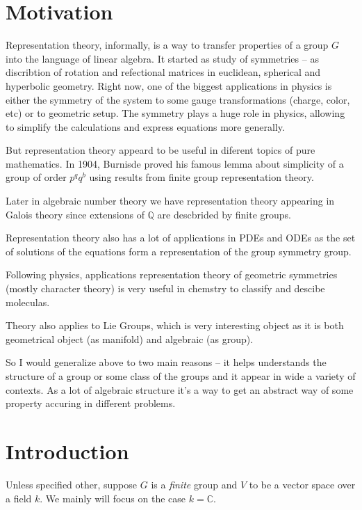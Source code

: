 \documentclass{amsart}
\author{M. Tikhonov}
\begin{document}
\newtheorem{definition}{Definition}
\newtheorem{note}{Note}
\newtheorem{lemma}{Lemma}
\newtheorem{theorem}{Theorem}

\section{Motivation}

Representation theory, informally, is a way to transfer properties of a group $G$  into the language of linear algebra. 
It started as study of symmetries -- as discribtion of rotation and refectional matrices in euclidean, spherical and hyperbolic geometry. 
Right now, one of the biggest applications in physics is either the symmetry of the system to some gauge transformations (charge, color, etc) or to geometric setup. 
The symmetry plays a huge role in physics, allowing to simplify the calculations and express equations more generally.

But representation theory appeard to be useful in diferent topics of pure mathematics.  
In 1904, Burnisde proved his famous lemma about simplicity of a group of order $p^q q^b$ using results from finite group representation theory.

Later in algebraic number theory we have representation theory appearing in Galois theory since extensions of $\mathbb{Q}$ are descbrided by finite groups.

Representation theory also has a lot of applications in PDEs and ODEs as the set of solutions of the equations form a representation of the group symmetry group.

Following physics, applications representation theory of geometric symmetries (mostly character theory) is very useful in chemstry to classify and descibe moleculas.

Theory also applies to Lie Groups, which is very interesting object as it is both geometrical object (as manifold) and algebraic (as group).

So I would generalize above to two main reasons -- it helps understands the structure of a group or some class of the groups and it appear in wide a variety of contexts.
As a lot of algebraic structure it's a way to get an abstract way of some property accuring in different problems.

\section{Introduction}
Unless specified other, suppose $G$ is a \textit{finite} group and $V$ to be a vector space over a field $k$. We mainly will focus on the case $k=\mathbb{C}$.
\end{document}
